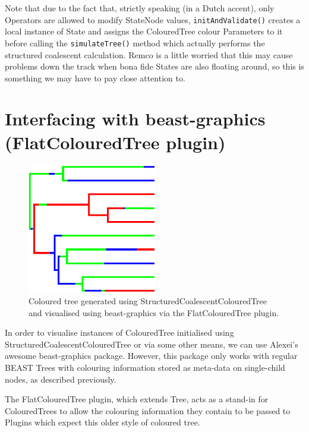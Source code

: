 \documentclass[a4paper,11pt]{paper}
\newcommand{\class}[1]{\textsf{#1}}
\newcommand{\project}[1]{\textsf{#1}}
\newcommand{\code}[1]{\texttt{#1}}
\begin{document}
Note that due to the fact that, strictly speaking (in a Dutch accent),
only \class{Operators} are allowed to modify \class{StateNode} values,
\code{initAndValidate()} creates a local instance of \class{State} and
assigns the \class{ColouredTree} colour \class{Parameters} to it
before calling the \code{simulateTree()} method which actually
performs the structured coalescent calculation.  Remco is a little
worried that this may cause problems down the track when bona fide
\class{State}s are also floating around, so this is something we may
have to pay close attention to.

\section{Interfacing with {\textsf beast-graphics} (FlatColouredTree plugin)}

\begin{figure}
	\centering
	\includegraphics[width=0.5\textwidth]{structuredCoalescentFig.pdf}
	\caption{Coloured tree generated using
		\class{StructuredCoalescentColouredTree} and visualised using
	\project{beast-graphics} via the \class{FlatColouredTree} plugin.}
	\label{fig:structuredCoalescent}
\end{figure}

In order to visualise instances of \class{ColouredTree} initialised
using \class{StructuredCoalescentColouredTree} or via some other
means, we can use Alexei's awesome \project{beast-graphics} package.
However, this package only works with regular BEAST \class{Tree}s
with colouring information stored as meta-data on single-child nodes,
as described previously.

The \class{FlatColouredTree} plugin, which extends \class{Tree}, acts
as a stand-in for \class{ColouredTree}s to allow the colouring
information they contain to be passed to \class{Plugin}s which expect
this older style of coloured tree.
\end{document}
